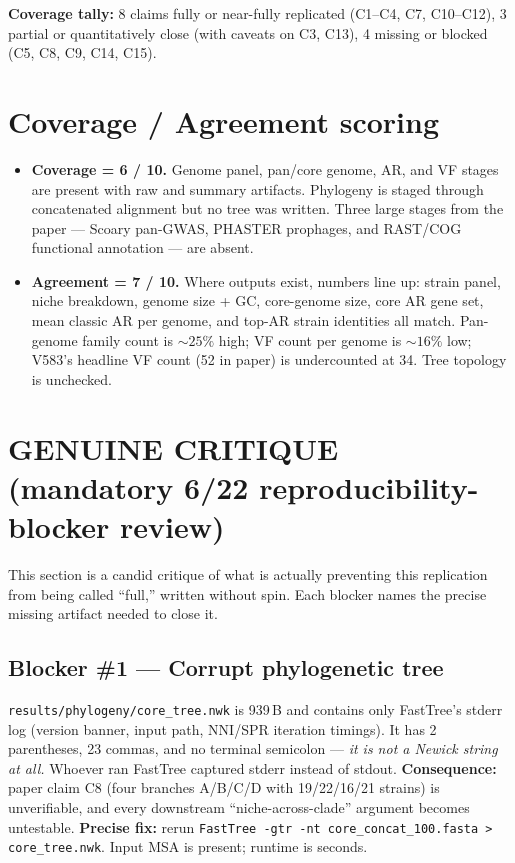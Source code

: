 \documentclass[11pt]{article}
\begin{document}
\noindent \textbf{Coverage tally:} 8 claims fully or near-fully replicated (C1--C4, C7, C10--C12), 3 partial or quantitatively close (with caveats on C3, C13), 4 missing or blocked (C5, C8, C9, C14, C15).

\section{Coverage / Agreement scoring}
\begin{itemize}[leftmargin=1.3em]
  \item \textbf{Coverage = 6 / 10.} Genome panel, pan/core genome, AR, and VF stages are present with raw and summary artifacts. Phylogeny is staged through concatenated alignment but no tree was written. Three large stages from the paper --- Scoary pan-GWAS, PHASTER prophages, and RAST/COG functional annotation --- are absent.
  \item \textbf{Agreement = 7 / 10.} Where outputs exist, numbers line up: strain panel, niche breakdown, genome size + GC, core-genome size, core AR gene set, mean classic AR per genome, and top-AR strain identities all match. Pan-genome family count is $\sim 25\%$ high; VF count per genome is $\sim 16\%$ low; V583's headline VF count (52 in paper) is undercounted at 34. Tree topology is unchecked.
\end{itemize}

\section{GENUINE CRITIQUE (mandatory 6/22 reproducibility-blocker review)}
This section is a candid critique of what is actually preventing this replication from being called ``full,'' written without spin. Each blocker names the precise missing artifact needed to close it.

\subsection*{Blocker \#1 --- Corrupt phylogenetic tree}
\texttt{results/phylogeny/core\_tree.nwk} is 939\,B and contains only FastTree's stderr log (version banner, input path, NNI/SPR iteration timings). It has 2 parentheses, 23 commas, and no terminal semicolon --- \emph{it is not a Newick string at all.} Whoever ran FastTree captured stderr instead of stdout. \textbf{Consequence:} paper claim C8 (four branches A/B/C/D with 19/22/16/21 strains) is unverifiable, and every downstream ``niche-across-clade'' argument becomes untestable. \textbf{Precise fix:} rerun \texttt{FastTree -gtr -nt core\_concat\_100.fasta > core\_tree.nwk}. Input MSA is present; runtime is seconds.
\end{document}
